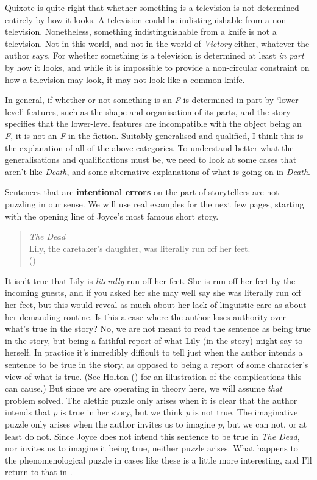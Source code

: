 \documentclass[
  10pt,
  letterpaper,
  DIV=11,
  numbers=noendperiod,
  twoside]{scrartcl}
\begin{document}
Quixote is quite right that whether something is a television is not
determined entirely by how it looks. A television could be
indistinguishable from a non-television. Nonetheless, something
indistinguishable from a knife is not a television. Not in this world,
and not in the world of \emph{Victory} either, whatever the author says.
For whether something is a television is determined at least \emph{in
part} by how it looks, and while it is impossible to provide a
non-circular constraint on how a television may look, it may not look
like a common knife.

In general, if whether or not something is an \emph{F} is determined in
part by `lower-level' features, such as the shape and organisation of
its parts, and the story specifies that the lower-level features are
incompatible with the object being an \emph{F}, it is not an \emph{F} in
the fiction. Suitably generalised and qualified, I think this is the
explanation of all of the above categories. To understand better what
the generalisations and qualifications must be, we need to look at some
cases that aren't like \emph{Death}, and some alternative explanations
of what is going on in \emph{Death}.

Sentences that are \textbf{intentional errors} on the part of
storytellers are not puzzling in our sense. We will use real examples
for the next few pages, starting with the opening line of Joyce's most
famous short story.

\begin{quote}
\emph{The Dead}\\
Lily, the caretaker's daughter, was literally run off her feet.\\
()
\end{quote}

It isn't true that Lily is \emph{literally} run off her feet. She is run
off her feet by the incoming guests, and if you asked her she may well
say she was literally run off her feet, but this would reveal as much
about her lack of linguistic care as about her demanding routine. Is
this a case where the author loses authority over what's true in the
story? No, we are not meant to read the sentence as being true in the
story, but being a faithful report of what Lily (in the story) might say
to herself. In practice it's incredibly difficult to tell just when the
author intends a sentence to be true in the story, as opposed to being a
report of some character's view of what is true. (See Holton
() for an illustration of the
complications this can cause.) But since we are operating in theory
here, we will assume \emph{that} problem solved. The alethic puzzle only
arises when it is clear that the author intends that \emph{p} is true in
her story, but we think \emph{p} is not true. The imaginative puzzle
only arises when the author invites us to imagine \emph{p}, but we can
not, or at least do not. Since Joyce does not intend this sentence to be
true in \emph{The Dead}, nor invites us to imagine it being true,
neither puzzle arises. What happens to the phenomenological puzzle in
cases like these is a little more interesting, and I'll return to that
in .
\end{document}
